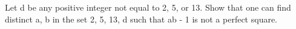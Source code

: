

\item Let d be any positive integer not equal to 2, 5, or 13. Show that one can find
distinct a, b in the set {2, 5, 13, d} such that ab - 1 is not a perfect square.


















